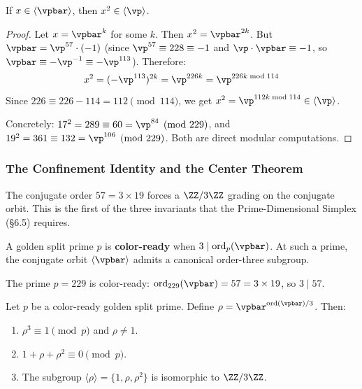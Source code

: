 \begin{proposition}\label{prop:square-cross}
If $x \in \langle\vpbar\rangle$, then $x^2 \in \langle\vp\rangle$.
\end{proposition}
\begin{proof}
Let $x = \vpbar^k$ for some $k$. Then $x^2 = \vpbar^{2k}$. But $\vpbar = \vp^{57} \cdot (-1)$ (since $\vp^{57} \equiv 228 \equiv -1$ and $\vp \cdot \vpbar \equiv -1$, so $\vpbar \equiv -\vp^{-1} \equiv -\vp^{113}$). Therefore:
$$x^2 = (-\vp^{113})^{2k} = \vp^{226k} = \vp^{226k \bmod 114}$$
Since $226 \equiv 226 - 114 = 112 \pmod{114}$, we get $x^2 = \vp^{112k \bmod 114} \in \langle\vp\rangle$.

Concretely: $17^2 = 289 \equiv 60 = \vp^{84} \pmod{229}$, and $19^2 = 361 \equiv 132 = \vp^{106} \pmod{229}$. Both are direct modular computations. \qedhere
\end{proof}

\subsubsection*{The Confinement Identity and the Center Theorem}

The conjugate order $57 = 3 \times 19$ forces a $\ZZ/3\ZZ$ grading on the conjugate orbit. This is the first of the three invariants that the Prime-Dimensional Simplex (\S6.5) requires.

\begin{definition}\label{def:color-ready}
A golden split prime $p$ is \textbf{color-ready} when $3 \mid \mathrm{ord}_p(\vpbar)$. At such a prime, the conjugate orbit $\langle\vpbar\rangle$ admits a canonical order-three subgroup.
\end{definition}

The prime $p = 229$ is color-ready: $\mathrm{ord}_{229}(\vpbar) = 57 = 3 \times 19$, so $3 \mid 57$.

\begin{theorem}\label{thm:confinement}
Let $p$ be a color-ready golden split prime. Define $\rho = \vpbar^{\mathrm{ord}(\vpbar)/3}$. Then:
\begin{enumerate}
\item $\rho^3 \equiv 1 \pmod{p}$ and $\rho \neq 1$.
\item $1 + \rho + \rho^2 \equiv 0 \pmod{p}$.
\item The subgroup $\langle\rho\rangle = \{1, \rho, \rho^2\}$ is isomorphic to $\ZZ/3\ZZ$.
\end{enumerate}
\end{theorem}

